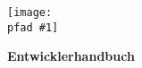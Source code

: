 \documentclass{scrartcl}
\newcommand{\pfad}{pics/}
\newcommand{\centerpic}[3]{
	\begin{center}
		\texttt{[image: \\pfad \#1]}\\
		{\small #3}
	\end{center}
}
\begin{document}
\begin{titlepage}
\centerpic{title}{1}{}
\vfill
\begin{flushright}
{\Huge \textbf{Entwicklerhandbuch}}
\end{flushright}
\end{titlepage}

\newpage

\tableofcontents
\newpage





\end{document}
